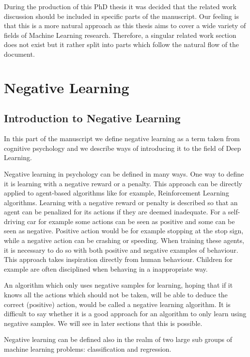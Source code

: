 \documentclass[b5paper]{book}
\let\cite\parencite
\begin{document}
During the production of this PhD thesis it was decided that the related work discussion should be included in specific parts of the manuscript. Our feeling is that this is a more natural approach as this thesis aims to cover a wide variety of fields of Machine Learning research. Therefore, a singular related work section does not exist but it rather split into parts which follow the natural flow of the document.

\part{Negative Learning}
\chapter{Introduction to Negative Learning}

In this part of the manuscript we define negative learning as a term taken from cognitive psychology and we describe ways of introducing it to the field of Deep Learning.

Negative learning in psychology \cite{mcleod2007bf} \cite{staddon2003operant} can be defined in many ways. One way to define it is learning with a negative reward or a penalty. This approach can be directly applied to agent-based algorithms like for example, Reinforcement Learning algorithms. Learning with a negative reward or penalty is described so that an agent can be penalized for its actions if they are deemed inadequate. For a self-driving car for example some actions can be seen as positive and some can be seen as negative. Positive action would be for example stopping at the stop sign, while a negative action can be crashing or speeding. When training these agents, it is necessary to do so with both positive and negative examples of behaviour. This approach takes inspiration directly from human behaviour. Children for example are often disciplined when behaving in a inappropriate way.

An algorithm which only uses negative samples for learning, hoping that if it knows all the actions which should not be taken, will be able to deduce the correct (positive) action, would be called a negative learning algorithm. It is difficult to say whether it is a good approach for an algorithm to only learn using negative samples. We will see in later sections that this is possible.

Negative learning can be defined also in the realm of two large sub groups of machine learning problems: classification and regression.
\end{document}
